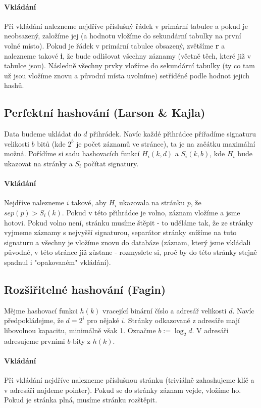 \documentclass[a4paper,12pt]{article}
\begin{document}
\paragraph{Vkládání} Při vkládání nalezneme nejdříve příslušný řádek v primární 
tabulce a pokud je neobsazený, založíme jej (a hodnotu vložíme do sekundární 
tabulky na první volné místo). Pokud je řádek v primární tabulce obsazený, 
zvětšíme \textbf{r} a nalezneme takové \textbf{i}, že bude odlišovat všechny 
záznamy (včetně těch, které již v tabulce jsou). Následně všechny prvky vložíme 
do sekundární tabulky (ty co tam už jsou vložíme znovu a původní místa uvolníme) 
setříděné podle hodnot jejich hashů.


\subsection{Perfektní hashování (Larson \& Kajla)}
\setcounter{equation}{0}
Data budeme ukládat do $d$ přihrádek. Navíc každé přihrádce přiřadíme signaturu 
velikosti $b$ bitů (kde $2^b$ je počet záznamů ve stránce), ta je na začátku 
maximální možná.  Pořídíme si sadu hashovacích funkcí $H_i(k,d)$ a $S_i(k,b)$, 
kde $H_i$ bude ukazovat na stránky a $S_i$ počítat signatury.
\paragraph{Vkládání}
Nejdříve nalezneme $i$ takové, aby $H_i$ ukazovala na stránku $p$, že $sep(p) > 
S_i(k)$. Pokud v této přihrádce je volno, záznam vložíme a jsme hotovi. Pokud 
volno není, stránku musíme štěpit - to uděláme tak, že ze stránky vyjmeme 
záznamy s nejvyšší signaturou, separátor stránky snížíme na tuto signaturu a 
všechny je vložíme znovu do databáze (záznam, který jsme vkládali původně, v 
této stránce již zůstane - rozmyslete si, proč by do této stránky stejně spadnul 
i "opakovaném" vkládání).

\subsection{Rozšiřitelné hashování (Fagin)}
\setcounter{equation}{0}
Mějme hashovací funkci $h(k)$ vracející binární číslo a adresář velikosti $d$.
Navíc předpokládejme, že $d = 2^i$ pro nějaké $i$. Stránky odkazované z adresáře 
mají libovolnou kapacitu, minimálně však 1. Označme $b := \log_2 d$.  V adresáři 
adresujeme prvními $b$-bity z $h(k)$.

\paragraph{Vkládání}
Při vkládání nejdříve nalezneme příslušnou stránku (triviálně zahashujeme klíč a 
v adresáři najdeme pointer). Pokud se do stránky záznam vejde, vložíme ho. Pokud 
je stránka plná, musíme stránku rozštěpit.
\end{document}
